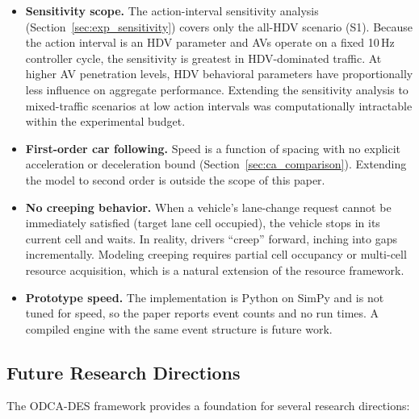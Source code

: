 \documentclass[review,authoryear]{elsarticle}
\begin{document}
\begin{itemize}
    \item \textbf{Sensitivity scope.} The action-interval sensitivity analysis (Section~\ref{sec:exp_sensitivity}) covers only the all-HDV scenario (S1). Because the action interval is an HDV parameter and AVs operate on a fixed 10\,Hz controller cycle, the sensitivity is greatest in HDV-dominated traffic. At higher AV penetration levels, HDV behavioral parameters have proportionally less influence on aggregate performance. Extending the sensitivity analysis to mixed-traffic scenarios at low action intervals was computationally intractable within the experimental budget.

    \item \textbf{First-order car following.} Speed is a function of spacing with no explicit acceleration or deceleration bound (Section~\ref{sec:ca_comparison}). Extending the model to second order is outside the scope of this paper.

    \item \textbf{No creeping behavior.} When a vehicle's lane-change request cannot be immediately satisfied (target lane cell occupied), the vehicle stops in its current cell and waits. In reality, drivers ``creep'' forward, inching into gaps incrementally. Modeling creeping requires partial cell occupancy or multi-cell resource acquisition, which is a natural extension of the resource framework.
    \item \textbf{Prototype speed.} The implementation is Python on SimPy and is not tuned for speed, so the paper reports event counts and no run times. A compiled engine with the same event structure is future work.
\end{itemize}

\subsection{Future Research Directions}

The ODCA-DES framework provides a foundation for several research directions:
\end{document}
